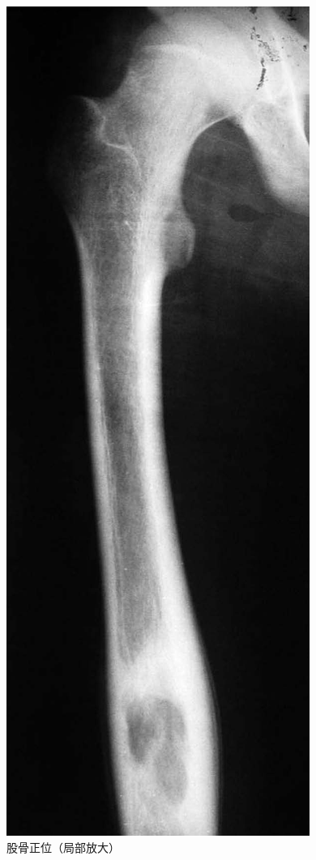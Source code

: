 \begin{figure}[!htbp]
 \centering
 \includegraphics{./images/Image00073.jpg}
 \captionsetup{justification=centering}
 \caption{股骨正位（局部放大）}
 \label{fig2-5-3}
  \end{figure} 

